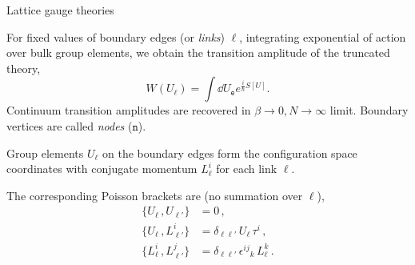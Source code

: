 \documentclass{beamer}
\newcommand\italictext[1]{\textcolor{italics}{\textit{#1}}}
\begin{document}
\begin{frame}{Lattice gauge theories}
    \begin{list}{\maltese}{\leftmargin=1em \itemindent=0em}
        \item<1-> For fixed values of boundary edges (or \italictext{links}) $\ell$, integrating exponential of action over bulk group elements, we obtain the transition amplitude of the truncated theory,
        \begin{equation}
            W(U_\ell)=\int\dd{U_\mathtt{e}}e^{\frac{i}{\hbar}S[U]}.
        \end{equation}
        Continuum transition amplitudes are recovered in $\beta\to 0,N\to\infty$ limit. Boundary vertices are called \italictext{nodes} ($\mathtt{n}$).
        \item<2-> Group elements $U_\ell$ on the boundary edges form the configuration space coordinates with conjugate momentum $L^i_\ell$ for each link $\ell$.
        \item<3-> The corresponding Poisson brackets are (no summation over $\ell$),
        \begin{align}
            \{U_\ell\,,U_{\ell'}\}&=0\,,\\
            \{U_{\ell}\,,L^i_{\ell'}\}&=\delta_{\ell\ell'}\,U_\ell\,\tau^i\,,\\
            \{L^i_{\ell}\,,L^j_{\ell'}\}&=\delta_{\ell\ell'}\,{\epsilon^{ij}}_k\, L^k_{\ell}\,.
        \end{align}
    \end{list}
\end{frame}
\end{document}
